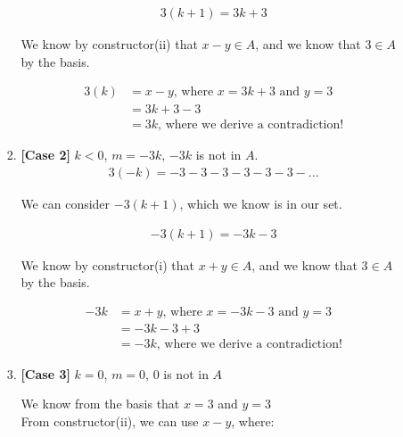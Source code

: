 \documentclass{article}
\begin{document}
\begin{itemize}
\begin{enumerate}[label=(\alph*)]
\begin{enumerate}[label=\arabic*.]
\begin{center}
                \end{center}
                \begin{align*}
                    3(k+1) = 3k+3
                \end{align*}
                \begin{center}
                    We know by constructor(ii) that $x-y \in A$, and we know that $3 \in A$ by the basis.
                \end{center}
                \begin{align*}
                    3(k) &= x - y \text{, where } x = 3k + 3 \text{ and } y = 3\\
                         &= 3k + 3 - 3\\
                         &= 3k \text{, where we derive a contradiction!}
                \end{align*}
                \item \textbf{[Case 2]} $k < 0$, $m = -3k$, $-3k$ is not in $A$.
                \begin{align*}
                    3(-k) = -3 -3 -3 -3 -3 -3 -...
                \end{align*}
                \begin{center}
                    We can consider $-3(k+1)$, which we know is in our set.
                \end{center}
                \begin{align*}
                    -3(k+1) = -3k-3
                \end{align*}
                \begin{center}
                    We know by constructor(i) that $x+y \in A$, and we know that $3 \in A$ by the basis.
                \end{center}
                \begin{align*}
                    -3k &= x+y \text{, where } x = -3k -3 \text{ and } y = 3\\
                        &= -3k -3 + 3\\
                        &= -3k \text{, where we derive a contradiction!}
                \end{align*}
                \item \textbf{[Case 3]} $k = 0$, $m = 0$, $0$ is not in $A$
                \begin{center}
                    We know from the basis that $x = 3$ and $y = 3$\\
                    From constructor(ii), we can use $x - y$, where:

\end{center}
\end{enumerate}
\end{enumerate}
\end{itemize}
\end{document}
